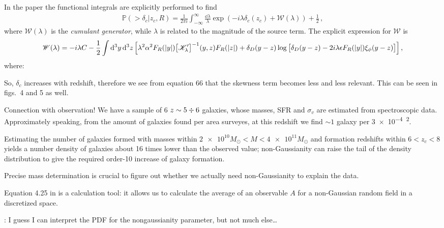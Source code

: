 \documentclass[main.tex]{subfiles}
\begin{document}
In the paper the functional integrals are explicitly performed to find 
%
\begin{align}
\mathbb{P}(> \delta _c | z_c, R) = \frac{1}{2 \pi i} \int_{- \infty }^{\infty } \frac{ \dd{\lambda }}{\lambda } \exp( - i \lambda \delta _c (z_c) + \mathscr{W}(\lambda )) + \frac{1}{2}
\,,
\end{align}
%
where \(\mathscr{W}(\lambda )\) is the \emph{cumulant generator}, while \(\lambda \) is related to the magnitude of the source term. The explicit expression for \(\mathscr{W}\) is 
%
\begin{align}
\mathscr{W}(\lambda ) =
- i \lambda C - \frac{1}{2} \int \dd[3]{y} \dd[3]{z} 
\qty[
    \lambda^2 \alpha^2 F_R (\abs{y }) \qty[\mathscr{K}'_\lambda ]^{-1} (y, z)
    F_R(\abs{z}) + \delta _D (y-z) 
    \log \qty[ \delta _D (y-z) - 2i \lambda \epsilon F_R (\abs{y}) \xi _\phi (y-z)]
]
\,,
\end{align}
%
where: 

So, \(\delta _c\) increases with redshift, therefore we see from equation 66 that the skewness term becomes less and less relevant. 
This can be seen in figs.\ 4 and 5 as well. 

Connection with observation! 
We have a sample of 6 \(z \sim 5 \divisionsymbol 6  \) galaxies, whose masses, SFR and \(\sigma _v\) are estimated from spectroscopic data.
Approximately speaking, from the amount of galaxies found per area surveyes, at this redshift we find \(\sim 1\) galaxy per \SI{3e-4}{\deg^2}. 

Estimating the number of galaxies formed with masses within \(\num{2e10} M_{\odot} < M < \num{4e11}M_{\odot}\) and formation redshifts within \(6 < z_c < 8\) yields a number density of galaxies about 16 times lower than the observed value; non-Gaussianity can raise the tail of the density distribution to give the required order-10 increase of galaxy formation. 

Precise mass determination is crucial to figure out whether we actually need non-Gaussianity to explain the data. 

Equation 4.25 in \textcite[]{verdeMultivariateJointPDF2013} is a calculation tool: it allows us to calculate the average of an observable \(A\) for a non-Gaussian random field in a discretized space. 

\textcite[]{planckcollaborationPlanck2018Results2019}: I guess I can interpret the PDF for the nongaussianity parameter, but not much else\dots
\end{document}
